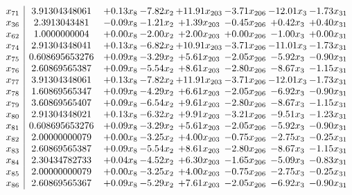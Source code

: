 \documentclass[8pt]{article}
\begin{document}
\[\begin{array}{c| c c@{\hskip 2pt} c@{\hskip 2pt} c@{\hskip 2pt} c@{\hskip 2pt} c@{\hskip 2pt} c@{\hskip 2pt} }
 x_{71}   &  3.91304348061 & +  0.13 x_{8} & -7.82 x_{2} & + 11.91 x_{203} & -3.71 x_{206} & -12.01 x_{3} & -1.73 x_{31}\\
 x_{36}   &  2.3913043481 & -0.09 x_{8} & -1.21 x_{2} & +  1.39 x_{203} & -0.45 x_{206} & +  0.42 x_{3} & +  0.40 x_{31}\\
 x_{62}   &  1.0000000004 & +  0.00 x_{8} & -2.00 x_{2} & +  2.00 x_{203} & +  0.00 x_{206} & -1.00 x_{3} & +  0.00 x_{31}\\
 x_{74}   &  2.91304348041 & +  0.13 x_{8} & -6.82 x_{2} & + 10.91 x_{203} & -3.71 x_{206} & -11.01 x_{3} & -1.73 x_{31}\\
 x_{75}   &  0.608695653276 & +  0.09 x_{8} & -3.29 x_{2} & +  5.61 x_{203} & -2.05 x_{206} & -5.92 x_{3} & -0.90 x_{31}\\
 x_{76}   &  2.60869565387 & +  0.09 x_{8} & -5.54 x_{2} & +  8.61 x_{203} & -2.80 x_{206} & -8.67 x_{3} & -1.15 x_{31}\\
 x_{77}   &  3.91304348061 & +  0.13 x_{8} & -7.82 x_{2} & + 11.91 x_{203} & -3.71 x_{206} & -12.01 x_{3} & -1.73 x_{31}\\
 x_{78}   &  1.60869565347 & +  0.09 x_{8} & -4.29 x_{2} & +  6.61 x_{203} & -2.05 x_{206} & -6.92 x_{3} & -0.90 x_{31}\\
 x_{79}   &  3.60869565407 & +  0.09 x_{8} & -6.54 x_{2} & +  9.61 x_{203} & -2.80 x_{206} & -8.67 x_{3} & -1.15 x_{31}\\
 x_{80}   &  2.91304348021 & +  0.13 x_{8} & -6.32 x_{2} & +  9.91 x_{203} & -3.21 x_{206} & -9.51 x_{3} & -1.23 x_{31}\\
 x_{81}   &  0.608695653276 & +  0.09 x_{8} & -3.29 x_{2} & +  5.61 x_{203} & -2.05 x_{206} & -5.92 x_{3} & -0.90 x_{31}\\
 x_{82}   &  2.00000000079 & +  0.00 x_{8} & -3.25 x_{2} & +  4.00 x_{203} & -0.75 x_{206} & -2.75 x_{3} & -0.25 x_{31}\\
 x_{83}   &  2.60869565387 & +  0.09 x_{8} & -5.54 x_{2} & +  8.61 x_{203} & -2.80 x_{206} & -8.67 x_{3} & -1.15 x_{31}\\
 x_{84}   &  2.30434782733 & +  0.04 x_{8} & -4.52 x_{2} & +  6.30 x_{203} & -1.65 x_{206} & -5.09 x_{3} & -0.83 x_{31}\\
 x_{85}   &  2.00000000079 & +  0.00 x_{8} & -3.25 x_{2} & +  4.00 x_{203} & -0.75 x_{206} & -2.75 x_{3} & -0.25 x_{31}\\
 x_{86}   &  2.60869565367 & +  0.09 x_{8} & -5.29 x_{2} & +  7.61 x_{203} & -2.05 x_{206} & -6.92 x_{3} & -0.90 x_{31}\\

\end{array}\]
\end{document}
